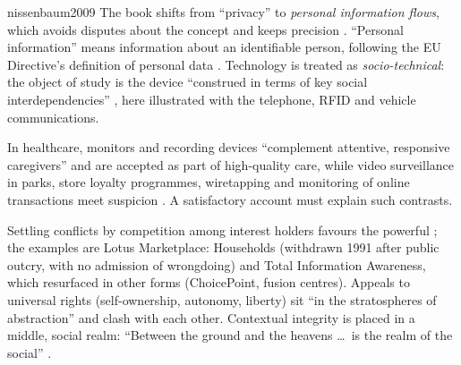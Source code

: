 \begin{papercard}{nissenbaum2009}
 The book shifts from ``privacy'' to \emph{personal information flows}, which avoids disputes about the concept and keeps precision . ``Personal information'' means information about an identifiable person, following the EU Directive's definition of personal data . Technology is treated as \emph{socio-technical}: the object of study is the device ``construed in terms of key social interdependencies'' , here illustrated with the telephone, RFID and vehicle communications.

 In healthcare, monitors and recording devices ``complement attentive, responsive caregivers'' and are accepted as part of high-quality care, while video surveillance in parks, store loyalty programmes, wiretapping and monitoring of online transactions meet suspicion . A satisfactory account must explain such contrasts.

 Settling conflicts by competition among interest holders favours the powerful ; the examples are Lotus Marketplace: Households (withdrawn 1991 after public outcry, with no admission of wrongdoing) and Total Information Awareness, which resurfaced in other forms (ChoicePoint, fusion centres). Appeals to universal rights (self-ownership, autonomy, liberty) sit ``in the stratospheres of abstraction'' and clash with each other. Contextual integrity is placed in a middle, social realm: ``Between the ground and the heavens \ldots\ is the realm of the social'' .


\end{papercard}

